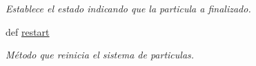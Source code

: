 \begin{DoxyCompactItemize}
\begin{DoxyCompactList}\small\item\em \-Establece el estado indicando que la particula a finalizado. \end{DoxyCompactList}\item 
\hypertarget{classengine_1_1particle_1_1SystemParticle_a012e0849751cd09d0480c119d9de2304}{
def \hyperlink{classengine_1_1particle_1_1SystemParticle_a012e0849751cd09d0480c119d9de2304}{restart}}
\label{classengine_1_1particle_1_1SystemParticle_a012e0849751cd09d0480c119d9de2304}

\begin{DoxyCompactList}\small\item\em \-Método que reinicia el sistema de particulas. \end{DoxyCompactList}\end{DoxyCompactItemize}
